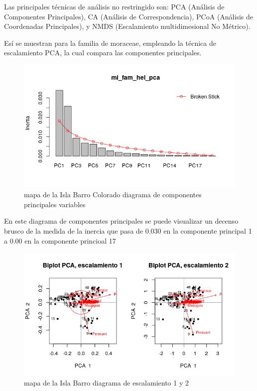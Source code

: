 \documentclass[11pt,]{article}
\begin{document}
Las principales técnicas de análisis no restringido son: PCA (Análisis
de Componentes Principales), CA (Análisis de Correspondencia), PCoA
(Análisis de Coordenadas Principales), y NMDS (Escalamiento
multidimesional No Métrico).

Esí se muestran para la familia de moraceae, empleando la técnica de
escalamiento PCA, la cual compara las componentes principales.

\begin{figure}
\centering
\includegraphics[width=1.00000\textwidth]{mi_fam_hel_pca.png}
\caption{mapa de la Isla Barro Colorado diagrama de componentes
principales variables\label{fig:bci_map}}
\end{figure}

En este diagrama de componentes principales se puede visualizar un
decenso brusco de la medida de la inercia que pasa de 0.030 en la
componente principal 1 a 0.00 en la componente princioal 17

\begin{figure}
\centering
\includegraphics[width=1.00000\textwidth]{escalamiento_1_2.png}
\caption{mapa de la Isla Barro diagrama de escalamiento 1 y 2
\label{fig:bci_map}}
\end{figure}
\end{document}

